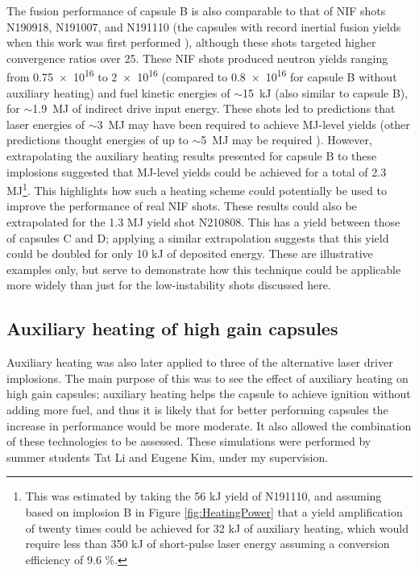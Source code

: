 The fusion performance of capsule B is also comparable to that of NIF shots N190918, N191007, and N191110 (the capsules with record inertial fusion yields when this work was first performed \cite{Zylstra2021}), although these shots targeted higher convergence ratios over 25. These NIF shots produced neutron yields ranging from \num{0.75e16} to \num{2e16} (compared to \num{0.8e16} for capsule B without auxiliary heating) and fuel kinetic energies of $\sim$15~kJ (also similar to capsule B), for $\sim$1.9~MJ of indirect drive input energy. These shots led to predictions that laser energies of $\sim$3~MJ \cite{Zylstra2021} may have been required to achieve MJ-level yields (other predictions thought energies of up to $\sim$5~MJ may be required \cite{Zylstra2021, Cheng2021}). However, extrapolating the auxiliary heating results presented for capsule B to these implosions suggested that MJ-level yields could be achieved for a total of 2.3 MJ\footnote{This was estimated by taking the 56 kJ yield of N191110, and assuming based on implosion B in Figure \ref{fig:HeatingPower} that a yield amplification of twenty times could be achieved for 32 kJ of auxiliary heating, which would require less than 350 kJ of short-pulse laser energy assuming a conversion efficiency of 9.6 \%.}. This highlights how such a heating scheme could potentially be used to improve the performance of real NIF shots. These results could also be extrapolated for the 1.3 MJ yield shot N210808. This has a yield between those of capsules C and D; applying a similar extrapolation suggests that this yield could be doubled for only 10 kJ of deposited energy. These are illustrative examples only, but serve to demonstrate how this technique could be applicable more widely than just for the low-instability shots discussed here.

\subsection{Auxiliary heating of high gain capsules}\label{sec:auxiliary-heating-of-high-gain-capsules}
Auxiliary heating was also later applied to three of the alternative laser driver implosions. The main purpose of this was to see the effect of auxiliary heating on high gain capsules; auxiliary heating helps the capsule to achieve ignition without adding more fuel, and thus it is likely that for better performing capsules the increase in performance would be more moderate. It also allowed the combination of these technologies to be assessed. These simulations were performed by summer students Tat Li and Eugene Kim, under my supervision.

